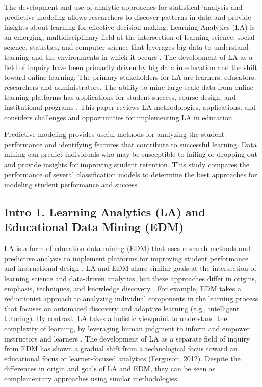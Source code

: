 \documentclass[sigconf]{acmart}
\begin{document}
The development and use of analytic approaches for 
statistical 'analysis and predictive modeling allows researchers to discover 
patterns in data and provide insights about learning for effective decision 
making. Learning Analytics (LA) is an emerging, multidisciplinary field at 
the intersection of learning science, social science, statistics, and computer 
science that leverages big data to understand learning and the environments 
in which it occurs \cite{siemens13}. The development of LA as a field of 
inquiry have been primarily driven by big data in education and the shift 
toward online learning. The primary stakeholders for LA are learners, educators, 
researchers and administrators. The ability to mine large scale data from online 
learning platforms has applications for student success, course design, and 
institutional programs \cite{Lester19}. This paper reviews LA methodologies, 
applications, and considers challenges and opportunities for implementing 
LA in education.

Predictive modeling provides useful methods for analyzing the student 
performance and identifying features that contribute to successful learning. 
Data mining can predict individuals who may be susceptible to failing or 
dropping out and provide insights for improving student retention. This study 
compares the performance of several classification models to determine the 
best approaches for modeling student performance and success. 


\subsection{Intro 1. Learning Analytics (LA) and Educational Data Mining (EDM)}

LA is a form of education data mining (EDM) that uses research methods and 
predictive analysis to implement platforms for improving student performance and 
instructional design \cite{Baker09, Lester19}. LA and EDM share similar goals 
at the intersection of learning science and data-driven analytics, but these 
approaches differ in origins, emphasis, techniques, and knowledge discovery 
\cite{siemens12}. For example, EDM takes a reductionist approach to analyzing 
individual components in the learning process that focuses on automated discovery
and adaptive learning (e.g., intelligent tutoring). By contrast, LA takes a 
holistic viewpoint to understand the complexity of learning, by leveraging human 
judgment to inform and empower instructors and learners \cite{Papamitsiou14}. 
The development of LA as a separate field of inquiry from EDM has shown a gradual 
shift from a technological focus toward an educational focus or learner-focused 
analytics (Ferguson, 2012). Despite the differences in origin and goals of LA 
and EDM, they can be seen as complementary approaches using similar methodologies. 
\end{document}
